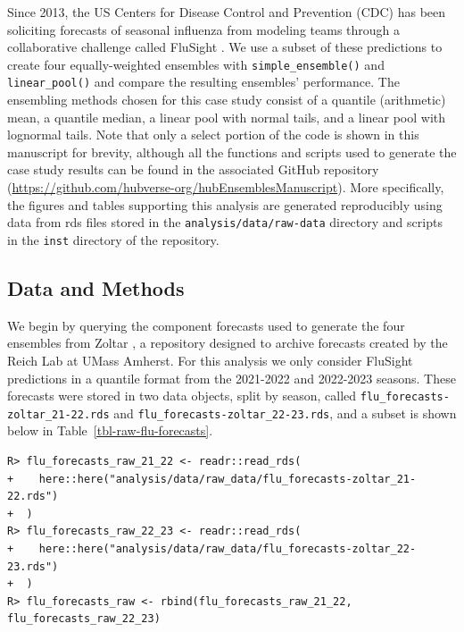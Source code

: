 \documentclass[
  article,
  shortnames,
  notitle]{jss}
\begin{document}
Since 2013, the US Centers for Disease Control and Prevention (CDC) has
been soliciting forecasts of seasonal influenza from modeling teams
through a collaborative challenge called FluSight \citep{cdc_flusight}.
We use a subset of these predictions to create four equally-weighted
ensembles with \texttt{simple\_ensemble()} and \texttt{linear\_pool()}
and compare the resulting ensembles' performance. The ensembling methods
chosen for this case study consist of a quantile (arithmetic) mean, a
quantile median, a linear pool with normal tails, and a linear pool with
lognormal tails. Note that only a select portion of the code is shown in
this manuscript for brevity, although all the functions and scripts used
to generate the case study results can be found in the associated GitHub
repository
(\url{https://github.com/hubverse-org/hubEnsemblesManuscript}). More
specifically, the figures and tables supporting this analysis are
generated reproducibly using data from rds files stored in the
\texttt{analysis/data/raw-data} directory and scripts in the
\texttt{inst} directory of the repository.

\subsection{Data and Methods}\label{data-and-methods}

We begin by querying the component forecasts used to generate the four
ensembles from Zoltar \citep{reich_zoltar_2021}, a repository designed
to archive forecasts created by the Reich Lab at UMass Amherst. For this
analysis we only consider FluSight predictions in a quantile format from
the 2021-2022 and 2022-2023 seasons. These forecasts were stored in two
data objects, split by season, called
\texttt{flu\_forecasts-zoltar\_21-22.rds} and
\texttt{flu\_forecasts-zoltar\_22-23.rds}, and a subset is shown below
in Table~\ref{tbl-raw-flu-forecasts}.

\begin{verbatim}
R> flu_forecasts_raw_21_22 <- readr::read_rds(
+    here::here("analysis/data/raw_data/flu_forecasts-zoltar_21-22.rds")
+  )
R> flu_forecasts_raw_22_23 <- readr::read_rds(
+    here::here("analysis/data/raw_data/flu_forecasts-zoltar_22-23.rds")
+  )
R> flu_forecasts_raw <- rbind(flu_forecasts_raw_21_22, flu_forecasts_raw_22_23)
\end{verbatim}
\end{document}
